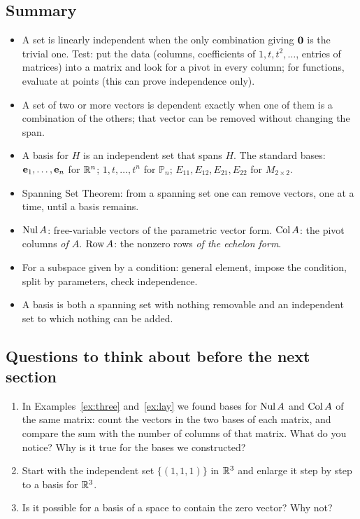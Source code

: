 \documentclass[11pt]{article}
\begin{document}
\subsection*{Summary}

\begin{itemize}
  \item A set is linearly independent when the only combination giving $\mathbf{0}$ is the trivial one. Test: put the data (columns, coefficients of $1,t,t^2,\dots$, entries of matrices) into a matrix and look for a pivot in every column; for functions, evaluate at points (this can prove independence only).
  \item A set of two or more vectors is dependent exactly when one of them is a combination of the others; that vector can be removed without changing the span.
  \item A basis for $H$ is an independent set that spans $H$. The standard bases: $\mathbf{e}_1,\dots,\mathbf{e}_n$ for $\mathbb{R}^n$; $1,t,\dots,t^n$ for $\mathbb{P}_n$; $E_{11},E_{12},E_{21},E_{22}$ for $M_{2\times2}$.
  \item Spanning Set Theorem: from a spanning set one can remove vectors, one at a time, until a basis remains.
  \item $\operatorname{Nul} A$: free-variable vectors of the parametric vector form. $\operatorname{Col} A$: the pivot columns \emph{of $A$}. $\operatorname{Row} A$: the nonzero rows \emph{of the echelon form}.
  \item For a subspace given by a condition: general element, impose the condition, split by parameters, check independence.
  \item A basis is both a spanning set with nothing removable and an independent set to which nothing can be added.
\end{itemize}

\subsection*{Questions to think about before the next section}

\begin{enumerate}
  \item In Examples~\ref{ex:three} and~\ref{ex:lay} we found bases for $\operatorname{Nul} A$ and $\operatorname{Col} A$ of the same matrix: count the vectors in the two bases of each matrix, and compare the sum with the number of columns of that matrix. What do you notice? Why is it true for the bases we constructed?
  \item Start with the independent set $\{(1,1,1)\}$ in $\mathbb{R}^3$ and enlarge it step by step to a basis for $\mathbb{R}^3$.
  \item Is it possible for a basis of a space to contain the zero vector? Why not?
\end{enumerate}
\end{document}

